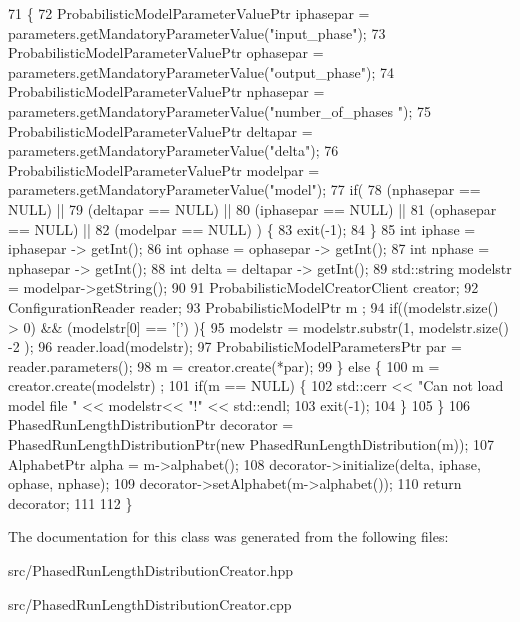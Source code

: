 \begin{DoxyCode}
71                                                                                                            
              \{
72     ProbabilisticModelParameterValuePtr iphasepar = parameters.getMandatoryParameterValue(\textcolor{stringliteral}{"input\_phase"});
73     ProbabilisticModelParameterValuePtr ophasepar = parameters.getMandatoryParameterValue(\textcolor{stringliteral}{"output\_phase"});
74     ProbabilisticModelParameterValuePtr nphasepar = parameters.getMandatoryParameterValue(\textcolor{stringliteral}{"number\_of\_phases
      "});
75     ProbabilisticModelParameterValuePtr  deltapar = parameters.getMandatoryParameterValue(\textcolor{stringliteral}{"delta"});
76     ProbabilisticModelParameterValuePtr  modelpar = parameters.getMandatoryParameterValue(\textcolor{stringliteral}{"model"});
77     \textcolor{keywordflow}{if}(
78        (nphasepar == NULL) ||
79        (deltapar == NULL) ||
80        (iphasepar == NULL) ||
81        (ophasepar == NULL) ||
82        (modelpar == NULL) ) \{
83       exit(-1);
84     \}
85     \textcolor{keywordtype}{int} iphase = iphasepar -> getInt();
86     \textcolor{keywordtype}{int} ophase = ophasepar -> getInt();
87     \textcolor{keywordtype}{int} nphase = nphasepar -> getInt();
88     \textcolor{keywordtype}{int} delta = deltapar -> getInt();
89     std::string modelstr = modelpar->getString();
90 
91     ProbabilisticModelCreatorClient creator;
92     ConfigurationReader reader;
93     ProbabilisticModelPtr m ;
94     \textcolor{keywordflow}{if}((modelstr.size() > 0) && (modelstr[0] == \textcolor{charliteral}{'['}) )\{
95       modelstr = modelstr.substr(1, modelstr.size() -2 );
96       reader.load(modelstr);
97       ProbabilisticModelParametersPtr par = reader.parameters();
98       m = creator.create(*par);
99     \} \textcolor{keywordflow}{else}  \{
100         m = creator.create(modelstr) ;
101         \textcolor{keywordflow}{if}(m == NULL) \{
102           std::cerr << \textcolor{stringliteral}{"Can not load model file "} << modelstr<< \textcolor{stringliteral}{"!"} << std::endl;
103           exit(-1);
104         \}
105       \}
106     PhasedRunLengthDistributionPtr decorator = PhasedRunLengthDistributionPtr(\textcolor{keyword}{new} 
      PhasedRunLengthDistribution(m));
107     AlphabetPtr alpha = m->alphabet();
108     decorator->initialize(delta, iphase, ophase, nphase);
109     decorator->setAlphabet(m->alphabet());
110     \textcolor{keywordflow}{return} decorator;
111 
112   \}
\end{DoxyCode}


The documentation for this class was generated from the following files\+:\begin{DoxyCompactItemize}
\item 
src/Phased\+Run\+Length\+Distribution\+Creator.\+hpp\item 
src/Phased\+Run\+Length\+Distribution\+Creator.\+cpp\end{DoxyCompactItemize}
